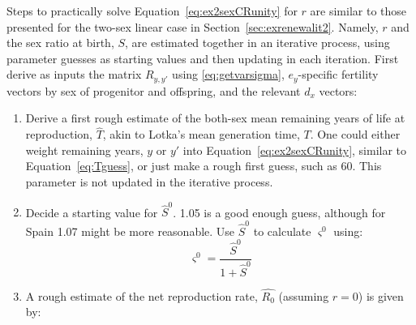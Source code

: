 
 \FloatBarrier
\label{sec:ex2sexCRit}
Steps to practically solve Equation~\eqref{eq:ex2sexCRunity} for $r$ are
similar to those presented for the two-sex linear case in
Section~\ref{sec:exrenewalit2}. Namely, $r$ and the sex ratio at birth, $S$, are
estimated together in an iterative process, using parameter guesses as starting
values and then updating in each iteration. First derive as inputs the matrix
$R_{y,y'}$ using \eqref{eq:getvarsigma}, $e_y$-specific fertility vectors by
sex of progenitor and offspring, and the relevant $d_x$ vectors:
\begin{enumerate}
  \item Derive a first rough estimate of the both-sex mean remaining years of
  life at reproduction, $\widehat{T}$, akin to Lotka's mean generation time,
  $T$. One could either weight remaining years, $y$ or $y'$ into
  Equation~\ref{eq:ex2sexCRunity}, similar to Equation~\ref{eq:Tguess}, or just
  make a rough first guess, such as 60. This parameter is not updated in the
  iterative process.

\item Decide a starting value for $\hat{S}^0$. 1.05 is a good enough guess,
although for Spain 1.07 might be more reasonable. Use $\hat{S}^0$ to calculate
$\varsigma^0$ using:
\begin{equation}
\label{eq:getvarsigma}
\varsigma^0 = \frac{\hat{S}^0}{1+\hat{S}^0}
\end{equation}

  \item A rough estimate of the net reproduction rate, $\widehat{R_0}$ (assuming
  $r=0$) is given by:


\end{enumerate}
